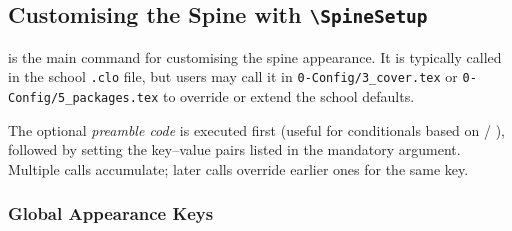 \subsection{Customising the Spine with \texttt{\textbackslash SpineSetup}}
\label{sub:spine_setup}

\latexinline{\SpineSetup} is the main command for customising the spine
appearance.  It is typically called in the school \texttt{.clo} file, but
users may call it in \verb!0-Config/3_cover.tex! or
\verb!0-Config/5_packages.tex! to override or extend the school defaults.

\begin{latexcode}
\end{latexcode}

The optional \emph{preamble code} is executed first (useful for
conditionals based on \latexinline{\ifmscdoc} / \latexinline{\ifphddoc}),
followed by setting the key–value pairs listed in the mandatory argument.
Multiple calls accumulate; later calls override earlier ones for the same
key.

\subsubsection*{Global Appearance Keys}

